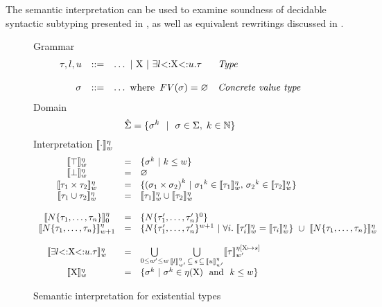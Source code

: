 The semantic interpretation can be used to examine soundness
of decidable syntactic subtyping presented in ,
as well as equivalent rewritings discussed in .

\begin{figure}[t]
\footnotesize
Grammar
\[\begin{array}{rcll}
    \tau, l, u &::=& \ldots ~\vert~ \mathrm{X} ~\vert~
        \exists l{\operatorname{<:}}\mathrm{X}{\operatorname{<:}}u.\tau
        & \textit{Type} \\
    \\
    \sigma &::=& \ldots \text{ where } \operatorname{\mathit{FV}}(\sigma) = \varnothing
        & \textit{Concrete value type} \\
\end{array}\]
Domain
\[
    \hat{\Sigma} = \{ \sigma^k \ ~\vert~\ \sigma \in \Sigma,\; k \in \mathbb{N} \}
\]
Interpretation $\llbracket \cdot \rrbracket^{\eta}_w$
\[
\begin{array}{ccl}
    \interpexdflt{\tyany} &=& \{ \gty^k \ |\ k \leq w \} \\
    \interpexdflt{\tybot} &=& \varnothing \\
    \interpexdflt{\typair{\ty_1}{\ty_2}} &=& 
        \{ {(\typair{\gty_1}{\gty_2})}^k \ | \ 
        {\gty_1}^k \in \interpexdflt{\ty_1},\,
        {\gty_2}^k \in \interpexdflt{\ty_2} \} \\
    \interpexdflt{\tyunion{\ty_1}{\ty_2}} &=& 
        \interpexdflt{\ty_1} \cup \interpexdflt{\ty_2} \\
    \\
    \interp{\tyinv\iname{\ty_1,\ldots,\ty_n}}^{\semsubstvars}_0 &=& 
        \{ \tyinv\iname{\ty'_1,\ldots,\ty'_n}^0 \} \\
    \interp{\tyinv\iname{\ty_1,\ldots,\ty_n}}^{\semsubstvars}_{w+1} &=& 
        \{ \tyinv\iname{\ty'_1,\ldots,\ty'_n}^{w+1} \ |\ 
            \forall i.\; \interpexdflt{\ty'_i} = \interpexdflt{\ty_i} \}
        \ \cup\ \interp{\tyinv\iname{\ty_1,\ldots,\ty_n}}^{\semsubstvars}_w \\
    \\
    \interpexdflt{\tyexist{\vx}{\tylb}{\tyub}{\ty}} &=& 
        \bigcup\limits_{0 \leq w' \leq w}
        \bigcup\limits_{\interp{\tylb}^{\semsubstvars}_{w'}
            \, \subseteq\, \gtyset\,
            \subseteq\, \interp{\tyub}^{\semsubstvars}_{w'}}
        \interp{\ty}^{\subst{\semsubstvars}{\substel{\vx\,}{\,\gtyset}}}_{w'} \\
    \interpexdflt{\vx} &=& \{ \gty^k \ |\ 
        \gty^k \in \semsubstvars(\vx)\ \text{ and }\ k \leq w \} \\
\end{array}
\]
\caption{Semantic interpretation for
existential types}\label{fig:sem:ty-inv-exist}
\end{figure}


